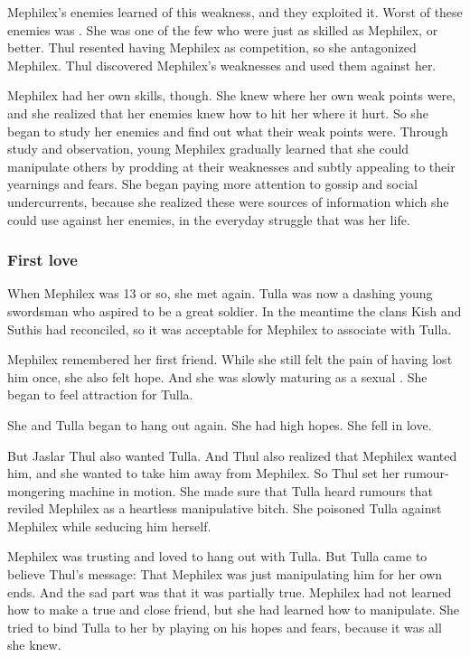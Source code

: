 Mephilex's enemies learned of this weakness, and they exploited it.
Worst of these enemies was . 
She was one of the few who were just as skilled as Mephilex, or better.
Thul resented having Mephilex as competition, so she antagonized Mephilex. 
Thul discovered Mephilex's weaknesses and used them against her.

Mephilex had her own skills, though. 
She knew where her own weak points were, and she realized that her enemies knew how to hit her where it hurt. 
So she began to study her enemies and find out what their weak points were. 
Through study and observation, young Mephilex gradually learned that she could manipulate others by prodding at their weaknesses and subtly appealing to their yearnings and fears. 
She began paying more attention to gossip and social undercurrents, because she realized these were sources of information which she could use against her enemies, in the everyday struggle that was her life. 





\subsubsection{First love}
When Mephilex was 13 or so, she met  again.
Tulla was now a dashing young swordsman who aspired to be a great soldier.
In the meantime the clans Kish and Suthis had reconciled, so it was acceptable for Mephilex to associate with Tulla. 

Mephilex remembered her first friend.
While she still felt the pain of having lost him once, she also felt hope.
And she was slowly maturing as a sexual \sphyle.
She began to feel attraction for Tulla.

She and Tulla began to hang out again. 
She had high hopes.
She fell in love.

But Jaslar Thul also wanted Tulla.
And Thul also realized that Mephilex wanted him, and she wanted to take him away from Mephilex. 
So Thul set her rumour-mongering machine in motion.
She made sure that Tulla heard rumours that reviled Mephilex as a heartless manipulative bitch. 
She poisoned Tulla against Mephilex while seducing him herself.

Mephilex was trusting and loved to hang out with Tulla. 
But Tulla came to believe Thul's message: 
That Mephilex was just manipulating him for her own ends.
And the sad part was that it was partially true.
Mephilex had not learned how to make a true and close friend, but she had learned how to manipulate. 
She tried to bind Tulla to her by playing on his hopes and fears, because it was all she knew.

